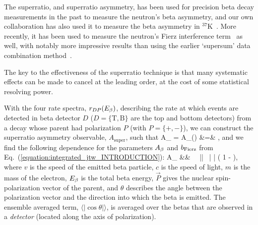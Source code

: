 The superratio, and superratio asymmetry, has been used for precision beta decay measurements in the past to measure the neutron's beta asymmetry\cite{UCNA_first_superratio}, and our own collaboration has also used it to measure the beta asymmetry in $^{37}$K~\cite{ben_Abeta}.  More recently, it has been used to measure the neutron's Fierz interference term~\cite{UCNAfierz2020}\cite{Saul2020} as well, with notably more impressive results than using the earlier `supersum' data combination method~\cite{UCNA_first_Fierz}.  

The key to the effectiveness of the superratio technique is that many systematic effects can be made to cancel at the leading order, at the cost of some statistical resolving power.  



With the four rate spectra, $r_{D P}(E_{\beta})$, describing the rate at which events are detected in beta detector $D$ ($D =\{ \mathrm{T, B}  \}$ are the top and bottom detectors) from a decay whose parent had polarization $P$ (with $P=\{+,-\}$), we can construct the superratio asymmetry observable, $A_{\mathrm{super}}$, such that
\bea
A_{} \;\;=\;\; A_{}(\Ebeta) 
&=& ,
\eea
and we find the following dependence for the parameters $A_{\beta}$ and $b_{\mathrm{Fierz}}$ from Eq.~(\ref{equation:integrated_jtw_INTRODUCTION}):
\bea
A_{} &\approx& \Abeta \,  \, || \, \langle | \cos\theta | \rangle \left( 1 - \bFierz {} \right), 
\eea
where $v$ is the speed of the emitted beta particle, $c$ is the speed of light, $m$ is the mass of the electron, $E_{\beta}$ is the total beta energy, $\vec{P}$ gives the nuclear spin-polarization vector of the parent, and $\theta$ describes the angle between the polarization vector and the direction into which the beta is emitted.  The ensemble averaged term, $\langle | \cos\theta | \rangle$, is averaged over the betas that are observed in a \emph{detector} (located along the axis of polarization).


